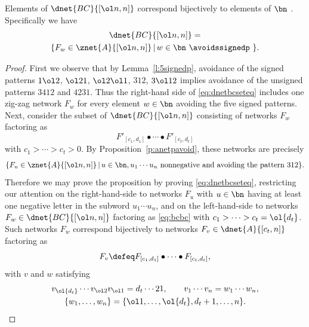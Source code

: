 \begin{thm}\label{t:dnetbcpavoid}
  Elements of $\dnet{BC}{[\ol n,n]}$ correspond bijectively to
  elements of $\bn$ \avoidingsignedp.
  Specifically we have
  \begin{multline}\label{eq:dnetbcseteq}
    \dnet{BC}{[\ol n, n]} = \\
    \{ F_w \in \znet{A}{[\ol n,n]} \,|\, w \in \bn
    \text{ \avoidssignedp }\}.
  \end{multline}
\end{thm}
\begin{proof}
  First we observe that by Lemma~\ref{l:5signedp},
  avoidance of the signed patterns
  $1\ol2$, $\ol21$, $\ol2\ol1$, $312$, $3\ol12$ implies
  avoidance of the unsigned patterns $3412$ and $4231$.
  Thus the right-hand side of \eqref{eq:dnetbcseteq}
  includes one zig-zag network $F_w$ for every element $w\in \bn$
  avoiding the five signed patterns.
  Next, consider the subset of $\dnet{BC}{[\ol n, n]}$
  consisting of networks $F_w$ factoring as
  \begin{equation}\label{eq:bcbc}
    F'_{[c_1,d_1]} \bullet \cdots \bullet F'_{[c_t,d_t]}
  \end{equation}
  with $c_1 > \cdots > c_t > 0$.
  By Proposition~\ref{p:anetpavoid},
  these networks are precisely
  \begin{equation*}
    \{ F_u \in \znet{A}{[\ol n,n]} \,|\, u \in \bn,
    u_1 \cdots u_n
    \text{ nonnegative and avoiding the pattern } 312 \}.
\end{equation*}
  Therefore we may prove the proposition
  by proving \eqref{eq:dnetbcseteq},
  restricting our attention
  on the right-hand-side
  to networks $F_u$
  with $u \in \bn$ having
  at least one negative letter in the subword $u_1 \cdots u_n$, and
  on the left-hand-side to networks $F_w \in \dnet{BC}{[\ol n, n]}$
  factoring as
  \eqref{eq:bcbc}
  with $c_1 > \cdots > c_t = \ol{d_t}$.
  Such networks $F_w$ correspond bijectively to networks
  $F_v \in \dnet{A}{[c_t,n]}$
  factoring as
  \begin{equation}\label{eq:abc}
  F_v \defeq F_{[c_1,d_1]} \bullet \cdots \bullet F_{[c_t,d_t]},  
  \end{equation}
  with $v$ and $w$ satisfying
  \begin{equation}\label{eq:vw}
    \begin{gathered}
    v_{\ol{d_t}} \cdots v_{\ol 2} v_{\ol 1} = d_t \cdots 21, \qquad
    v_1 \cdots v_n = w_1 \cdots w_n,\\
    \{w_1, \dotsc, w_n \} = \{\ol1, \dotsc, \ol{d_t}, d_t+1,\dotsc, n\}.
   \end{gathered}
  \end{equation}
  

\end{proof}
